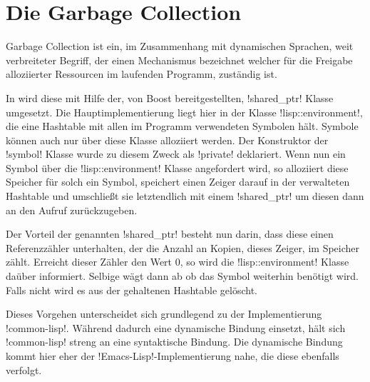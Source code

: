 \section{Die Garbage Collection}

Garbage Collection ist ein, im Zusammenhang mit dynamischen Sprachen, weit verbreiteter Begriff, der
einen Mechanismus bezeichnet welcher für die Freigabe alloziierter Ressourcen im laufenden Programm, zuständig
ist.

In \projectname wird diese mit Hilfe der, von Boost bereitgestellten, !shared_ptr! Klasse umgesetzt.
Die Hauptimplementierung liegt hier in der Klasse !lisp::environment!, die eine Hashtable mit allen
im Programm verwendeten Symbolen hält. Symbole können auch nur über diese Klasse alloziiert werden. Der
Konstruktor der !symbol! Klasse wurde zu diesem Zweck als !private! deklariert.
Wenn nun ein Symbol über die !lisp::environment! Klasse angefordert wird, so alloziiert diese
Speicher für solch ein Symbol, speichert einen Zeiger darauf in der verwalteten Hashtable
und umschließt sie letztendlich mit einem !shared_ptr! um diesen dann an den Aufruf zurückzugeben.

Der Vorteil der genannten !shared_ptr! besteht nun darin, dass diese einen Referenzzähler unterhalten,
der die Anzahl an Kopien, dieses Zeiger, im Speicher zählt. Erreicht dieser Zähler den Wert 0, so
wird die !lisp::environment! Klasse daüber informiert. Selbige wägt dann ab ob das Symbol weiterhin benötigt
wird. Falls nicht wird es aus der gehaltenen Hashtable gelöscht.

Dieses Vorgehen unterscheidet sich grundlegend zu der Implementierung !common-lisp!. Während \projectname
dadurch eine dynamische Bindung einsetzt, hält sich !common-lisp! streng an eine syntaktische Bindung.
Die dynamische Bindung kommt hier eher der !Emacs-Lisp!-Implementierung nahe, die diese ebenfalls verfolgt.
